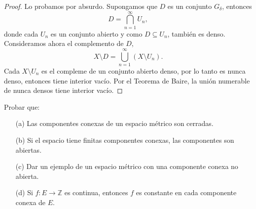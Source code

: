 \begin{proof}
    Lo probamos por absurdo. Supongamos que $D$ es un conjunto $G_\delta$, entonces
    \begin{equation*}
        D = \bigcap_{n=1}^{\infty} U_n,
    \end{equation*}
    donde cada $U_n$ es un conjunto abierto y como $D \subseteq U_n$, también es denso. Consideramos ahora el complemento de $D$,
    \begin{equation*}
        X \setminus D = \bigcup_{n=1}^{\infty} (X \setminus U_n).
    \end{equation*}
    Cada $X \setminus U_n$ es el compleme de un conjunto abierto denso, por lo tanto es nunca denso, entonces tiene interior vacío. Por el Teorema de Baire, la unión numerable de nunca densos tiene interior vacío.           
\end{proof}

\begin{exercise}
    Probar que:
    \begin{enumerate}
        \item[(a)] Las componentes conexas de un espacio métrico son cerradas.
        \item[(b)] Si el espacio tiene finitas componentes conexas, las componentes son abiertas.
        \item[(c)] Dar un ejemplo de un espacio métrico con una componente conexa no abierta.
        \item[(d)] Si $f : E \to \mathbb{Z}$ es continua, entonces $f$ es constante en cada componente conexa de $E$.
    \end{enumerate}
\end{exercise}

